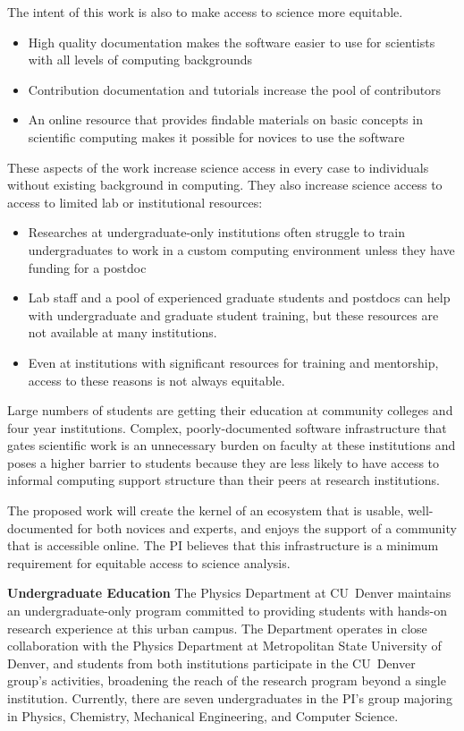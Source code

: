 The intent of this work is also to make access to science more equitable.  
\begin{itemize}
    \item High quality documentation makes the software easier to use for scientists with all levels of computing backgrounds
    \item Contribution documentation and tutorials increase the pool of contributors
    \item An online resource that provides findable materials on basic concepts in scientific computing makes it possible for novices to use the software
\end{itemize}

These aspects of the work increase science access in every case to individuals without existing background in computing.  They also increase science access to access to limited lab or institutional resources: 

\begin{itemize}
    \item Researches at undergraduate-only institutions often struggle to train undergraduates to work in a custom computing environment unless they have funding for a postdoc
    \item Lab staff and a pool of experienced graduate students and postdocs can help with undergraduate and graduate student training, but these resources are not available at many institutions.
    \item Even at institutions with significant resources for training and mentorship, access to these reasons is not always equitable.  
\end{itemize}

Large numbers of students are getting their education at community colleges and four year institutions.  Complex, poorly-documented software infrastructure that gates scientific work is an unnecessary burden on faculty at these institutions and poses a higher barrier to students because they are less likely to have access to informal computing support structure than their peers at research institutions.

The proposed work will create the kernel of an ecosystem that is usable, well-documented for both novices and experts, and enjoys the support of a community that is accessible online.  The PI believes that this infrastructure is a minimum requirement for equitable access to science analysis.



\textbf{Undergraduate Education}
The Physics Department at CU~Denver maintains an undergraduate-only program committed to providing students with hands-on research experience at this urban campus. The Department operates in close collaboration with the Physics Department at Metropolitan State University of Denver, and students from both institutions participate in the CU~Denver group’s activities, broadening the reach of the research program beyond a single institution. Currently, there are seven undergraduates in the PI's group majoring in Physics, Chemistry,  Mechanical Engineering, and Computer Science.  


